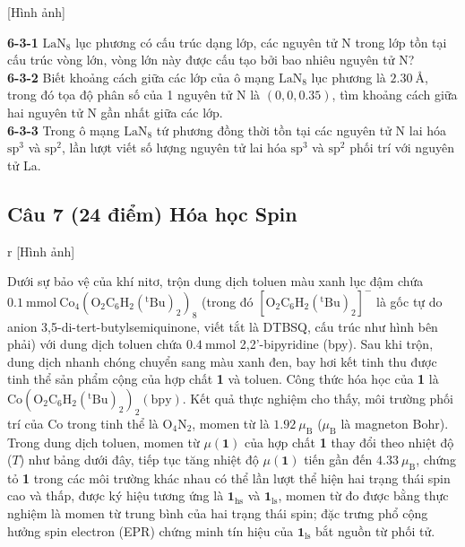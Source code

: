 \begin{center}
    [Hình ảnh]
\end{center}

\noindent
\textbf{6-3-1} $\mathrm{LaN_8}$ lục phương có cấu trúc dạng lớp, các nguyên tử N trong lớp tồn tại cấu trúc vòng lớn, vòng lớn này được cấu tạo bởi bao nhiêu nguyên tử N? \\
\textbf{6-3-2} Biết khoảng cách giữa các lớp của ô mạng $\mathrm{LaN_8}$ lục phương là $2.30\ \text{\AA}$, trong đó tọa độ phân số của 1 nguyên tử N là $(0, 0, 0.35)$, tìm khoảng cách giữa hai nguyên tử N gần nhất giữa các lớp. \\
\textbf{6-3-3} Trong ô mạng $\mathrm{LaN_8}$ tứ phương đồng thời tồn tại các nguyên tử N lai hóa $\mathrm{sp^3}$ và $\mathrm{sp^2}$, lần lượt viết số lượng nguyên tử lai hóa $\mathrm{sp^3}$ và $\mathrm{sp^2}$ phối trí với nguyên tử La.

\vspace{0.5cm}

\subsection{Câu 7 (24 điểm) Hóa học Spin}

\begin{center}{r}
    [Hình ảnh]
\end{center}
Dưới sự bảo vệ của khí nitơ, trộn dung dịch toluen màu xanh lục đậm chứa $0.1\ \mathrm{mmol\ Co_4(O_2C_6H_2(^tBu)_2)_8}$ (trong đó $[\mathrm{O_2C_6H_2(^tBu)_2}]^-$ là gốc tự do anion 3,5-di-tert-butylsemiquinone, viết tắt là DTBSQ, cấu trúc như hình bên phải) với dung dịch toluen chứa $0.4\ \mathrm{mmol}$ 2,2'-bipyridine (bpy). Sau khi trộn, dung dịch nhanh chóng chuyển sang màu xanh đen, bay hơi kết tinh thu được tinh thể sản phẩm cộng của hợp chất \textbf{1} và toluen. Công thức hóa học của \textbf{1} là $\mathrm{Co(O_2C_6H_2(^tBu)_2)_2(bpy)}$. Kết quả thực nghiệm cho thấy, môi trường phối trí của Co trong tinh thể là $\mathrm{O_4N_2}$, momen từ là $1.92\ \mu_\mathrm{B}$ ($\mu_\mathrm{B}$ là magneton Bohr). Trong dung dịch toluen, momen từ $\mu(\mathbf{1})$ của hợp chất \textbf{1} thay đổi theo nhiệt độ ($T$) như bảng dưới đây, tiếp tục tăng nhiệt độ $\mu(\mathbf{1})$ tiến gần đến $4.33\ \mu_\mathrm{B}$, chứng tỏ \textbf{1} trong các môi trường khác nhau có thể lần lượt thể hiện hai trạng thái spin cao và thấp, được ký hiệu tương ứng là $\mathbf{1}_\mathrm{hs}$ và $\mathbf{1}_\mathrm{ls}$, momen từ đo được bằng thực nghiệm là momen từ trung bình của hai trạng thái spin; đặc trưng phổ cộng hưởng spin electron (EPR) chứng minh tín hiệu của $\mathbf{1}_\mathrm{ls}$ bắt nguồn từ phối tử.

